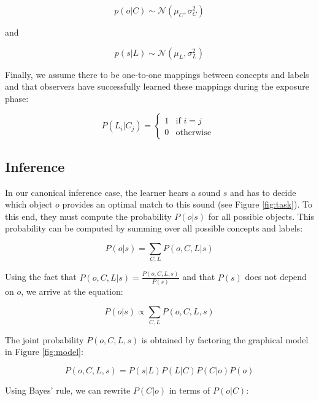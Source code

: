 \documentclass[english,,man,floatsintext]{apa6}
\theoremstyle{definition}
\theoremstyle{definition}
\theoremstyle{definition}
\theoremstyle{remark}
\begin{document}
\begin{equation} \label{eq:object}
 p(o | C) \sim  \mathcal{N}(\mu_C, \sigma^2_C) 
\end{equation}

\begin{center}
and 
\end{center}

\begin{equation} \label{eq:sound}
p(s| L) \sim  \mathcal{N}(\mu_L, \sigma^2_L)
\end{equation}

Finally, we assume there to be one-to-one mappings between concepts and
labels and that observers have successfully learned these mappings
during the exposure phase:

\begin{equation}
P(L_i|C_j) = 
\begin{cases}
  1 & \text{if  }  i=j \\  
  0  & \text{otherwise  }
\end{cases}
\end{equation}

\subsection{Inference}\label{inference}

In our canonical inference case, the learner hears a sound \(s\) and has
to decide which object \(o\) provides an optimal match to this sound
(see Figure \ref{fig:task}). To this end, they must compute the
probability \(P(o|s)\) for all possible objects. This probability can be
computed by summing over all possible concepts and labels:

\begin{equation}
P(o|s)=\sum_{C,L} P(o, C, L| s)  
\end{equation}

Using the fact that \(P(o,C,L|s) = \frac{P(o,C,L,s)}{P(s)}\) and that
\(P(s)\) does not depend on \(o\), we arrive at the equation:

\begin{equation}
P(o|s) \propto \sum_{C,L} P(o, C, L, s) 
\end{equation}

The joint probability \(P(o,C,L,s)\) is obtained by factoring the
graphical model in Figure \ref{fig:model}:

\[P(o,C,L,s) = P(s|L)P(L|C)P(C|o)P(o)\]

Using Bayes' rule, we can rewrite \(P(C|o)\) in terms of \(P(o|C)\):
\end{document}
